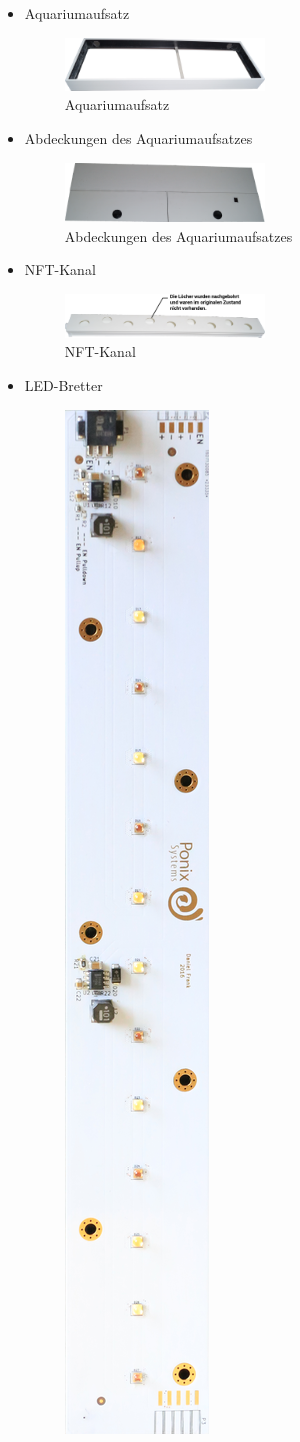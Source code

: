 \begin{itemize}
    \item{Aquariumaufsatz}\mbox{} \\
    \begin{figure}[ht]
        \centering
        \includegraphics[width=0.5\textwidth]{images/Aufsatz}
	    \caption{Aquariumaufsatz}
    \end{figure}
    \item{Abdeckungen des Aquariumaufsatzes}\mbox{} \\
    \begin{figure}[ht]
        \centering
        \includegraphics[width=0.5\textwidth]{images/Abdeckungen}
	    \caption{Abdeckungen des Aquariumaufsatzes}
    \end{figure}
    \item{\gls{NFT}-Kanal}\mbox{} \\
    \begin{figure}[ht]
        \centering
        \includegraphics[width=0.5\textwidth]{images/NFT-Kanal}
	    \caption{\gls{NFT}-Kanal}
    \end{figure}
    \newpage
    \item{LED-Bretter}\mbox{} \\
    \begin{figure}[ht]
       \centering
       \includegraphics[height=0.5\textwidth, angle=90]{images/pflanzenLicht}

\end{figure}
\end{itemize}
